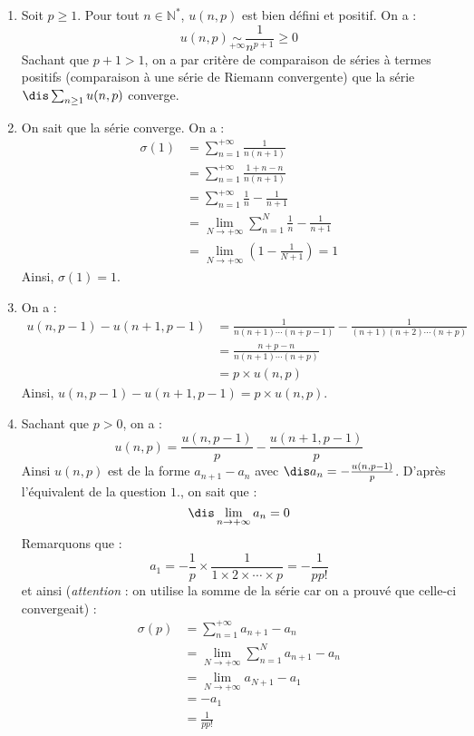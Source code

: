\documentclass[a4paper,10pt]{report}
\begin{document}
\corr \begin{enumerate}
\item Soit $p \geq 1$. Pour tout $n \in \mathbb{N}^*$, $u(n,p)$ est bien défini et positif. On a :
$$u(n,p) \underset{+\infty}{\sim} \frac{1}{n^{p+1}} \geq 0$$
Sachant que $p+1>1$, on a par critère de comparaison de séries à termes positifs (comparaison à une série de Riemann convergente) que la s\'erie $\dis \sum_{n \geq 1} u(n,p)$ converge.

\item  On sait que la s\'erie converge. On a : 
\begin{align*}
\sigma (1)& =\sum_{n=1}^{+\infty }\frac{1}{n(n+1)} \\
& =\sum_{n=1}^{+\infty }\frac{1+n-n}{n(n+1)} \\
& =\sum_{n=1}^{+\infty }\frac{1}{n}-\frac{1}{n+1} \\
& = \lim_{N \rightarrow + \infty} \sum_{n=1}^{N}\frac{1}{n}-\frac{1}{n+1} \\
& =\lim_{N \rightarrow +\infty }\left(1- \frac{1}{N+1}\right) =1 
\end{align*}
Ainsi, $\sigma(1)=1$.
\item On a :
\begin{align*}
u(n,p-1)-u(n+1,p-1) & =\frac{1}{n(n+1)\cdots (n+p-1)}-\frac{1}{(n+1)(n+2)\cdots
(n+p)} \\
& =\frac{n+p-n}{n(n+1)\cdots (n+p)} \\
& =p \times u(n,p) 
\end{align*}
Ainsi, $u(n,p-1)-u(n+1,p-1)=p \times u(n,p)$.
\item Sachant que $p>0$, on a :
\[
u(n,p)=\frac{u(n,p-1)}{p}-\frac{u(n+1,p-1)}{p} 
\]
Ainsi $u(n,p)$ est de la forme $a_{n+1}-a_n$ avec $ \dis a_n=-\frac{u(n,p-1)}{p}$. D'apr\`es l'\'equivalent de la question $1.$,  on sait que :
$$\dis \lim_{n \rightarrow + \infty} a_{n}=0$$
Remarquons que : 
$$a_{1}=-\frac{1}{p} \times \frac{1}{1 \times 2 \times \cdots \times p}=-\frac{1}{pp!}$$ 
et ainsi (\textit{attention} : on utilise la somme de la série car on a prouvé que celle-ci convergeait) :
\begin{align*}
\sigma(p) & = \sum_{n=1}^{+ \infty} a_{n+1}-a_n \\
& = \lim_{N \rightarrow + \infty}  \sum_{n=1}^{N} a_{n+1}-a_n \\
& = \lim_{N \rightarrow + \infty} a_{N+1} - a_1 \\
& = - a_1 \\
& = \frac{1}{pp!} 
\end{align*}
\end{enumerate}
\end{document}
